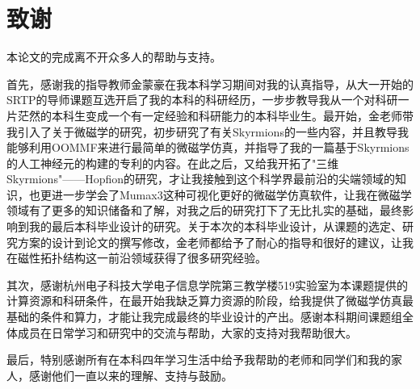 \chapter*{致\hspace{1em}谢}

本论文的完成离不开众多人的帮助与支持。

首先，感谢我的指导教师金蒙豪在我本科学习期间对我的认真指导，从大一开始的SRTP的导师课题互选开启了我的本科的科研经历，一步步教导我从一个对科研一片茫然的本科生变成一个有一定经验和科研能力的本科毕业生。最开始，金老师带我引入了关于微磁学的研究，初步研究了有关Skyrmions的一些内容，并且教导我能够利用OOMMF来进行最简单的微磁学仿真，并指导了我的一篇基于Skyrmions的人工神经元的构建的专利的内容。在此之后，又给我开拓了"三维Skyrmions"——Hopfion的研究，才让我接触到这个科学界最前沿的尖端领域的知识，也更进一步学会了Mumax3这种可视化更好的微磁学仿真软件，让我在微磁学领域有了更多的知识储备和了解，对我之后的研究打下了无比扎实的基础，最终影响到我的最后本科毕业设计的研究。关于本次的本科毕业设计，从课题的选定、研究方案的设计到论文的撰写修改，金老师都给予了耐心的指导和很好的建议，让我在磁性拓扑结构这一前沿领域获得了很多研究经验。

其次，感谢杭州电子科技大学电子信息学院第三教学楼519实验室为本课题提供的计算资源和科研条件，在最开始我缺乏算力资源的阶段，给我提供了微磁学仿真最基础的条件和算力，才能让我完成最终的毕业设计的产出。感谢本科期间课题组全体成员在日常学习和研究中的交流与帮助，大家的支持对我帮助很大。

最后，特别感谢所有在本科四年学习生活中给予我帮助的老师和同学们和我的家人，感谢他们一直以来的理解、支持与鼓励。
